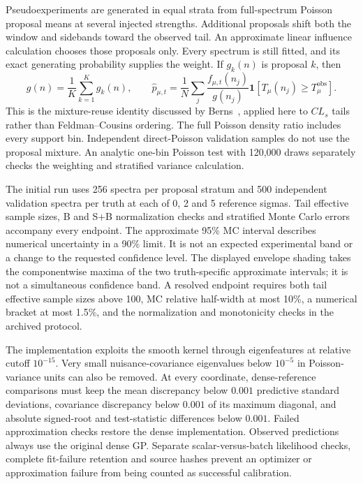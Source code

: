 \documentclass[11pt]{article}
\begin{document}
Pseudoexperiments are generated in equal strata from full-spectrum Poisson
proposal means at several injected strengths. Additional proposals shift
both the window and sidebands toward the observed tail. An approximate
linear influence calculation chooses those proposals only. Every spectrum
is still fitted, and its exact generating probability supplies the weight.
If $g_k(n)$ is proposal $k$, then
\begin{equation}
 g(n)=\frac{1}{K}\sum_{k=1}^K g_k(n),\qquad
 \widehat p_{\mu,t}=\frac{1}{N}\sum_j
 \frac{f_{\mu,t}(n_j)}{g(n_j)}
 \mathbf{1}[T_\mu(n_j)\ge T_\mu^{\mathrm{obs}}].
\end{equation}
This is the mixture-reuse identity discussed by Berns~\cite{berns}, applied
here to $CL_s$ tails rather than Feldman--Cousins ordering. The full Poisson
density ratio includes every support bin. Independent direct-Poisson
validation samples do not use the proposal mixture. An analytic one-bin
Poisson test with 120,000 draws separately checks the weighting and
stratified variance calculation.

The initial run uses 256 spectra per proposal stratum and 500 independent
validation spectra per truth at each of 0, 2 and 5 reference sigmas. Tail
effective sample sizes, B and S+B normalization checks and stratified
Monte Carlo errors accompany every endpoint. The approximate 95\% MC
interval describes numerical uncertainty in a 90\% limit. It is not an
expected experimental band or a change to the requested confidence level.
The displayed envelope shading takes the componentwise maxima of the two
truth-specific approximate intervals; it is not a simultaneous confidence band.
A resolved endpoint requires both tail effective sample sizes above 100,
MC relative half-width at most 10\%, a numerical bracket at most 1.5\%,
and the normalization and monotonicity checks in the archived protocol.

The implementation exploits the smooth kernel through eigenfeatures at
relative cutoff $10^{-15}$. Very small nuisance-covariance eigenvalues
below $10^{-5}$ in Poisson-variance units can also be removed. At every
coordinate, dense-reference comparisons must keep the mean discrepancy
below $0.001$ predictive standard deviations, covariance discrepancy below
$0.001$ of its maximum diagonal, and absolute signed-root and test-statistic
differences below $0.001$. Failed approximation checks restore the dense
implementation. Observed predictions always use the original dense GP.
Separate scalar-versus-batch likelihood checks, complete fit-failure
retention and source hashes prevent an optimizer or approximation failure
from being counted as successful calibration.
\end{document}
